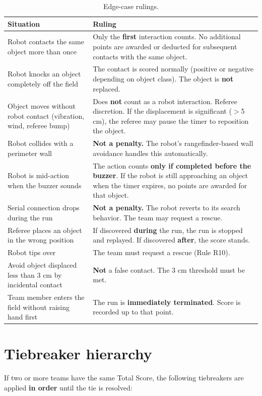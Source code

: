 \documentclass[a4]{article}
\begin{document}
\begin{table}[H]
\centering
\begin{tabular}{p{5cm}p{8cm}}
\toprule
\textbf{Situation} & \textbf{Ruling} \\
\midrule
Robot contacts the same object more than once & Only the \textbf{first} interaction counts. No additional points are awarded or deducted for subsequent contacts with the same object. \\
\addlinespace
Robot knocks an object completely off the field & The contact is scored normally (positive or negative depending on object class). The object is \textbf{not} replaced. \\
\addlinespace
Object moves without robot contact (vibration, wind, referee bump) & Does \textbf{not} count as a robot interaction. Referee discretion. If the displacement is significant ($>$5 cm), the referee may pause the timer to reposition the object. \\
\addlinespace
Robot collides with a perimeter wall & \textbf{Not a penalty.} The robot's rangefinder-based wall avoidance handles this automatically. \\
\addlinespace
Robot is mid-action when the buzzer sounds & The action counts \textbf{only if completed before the buzzer}. If the robot is still approaching an object when the timer expires, no points are awarded for that object. \\
\addlinespace
Serial connection drops during the run & \textbf{Not a penalty.} The robot reverts to its search behavior. The team may request a rescue. \\
\addlinespace
Referee places an object in the wrong position & If discovered \textbf{during} the run, the run is stopped and replayed. If discovered \textbf{after}, the score stands. \\
\addlinespace
Robot tips over & The team must request a rescue (Rule R10). \\
\addlinespace
Avoid object displaced less than 3 cm by incidental contact & \textbf{Not} a false contact. The 3 cm threshold must be met. \\
\addlinespace
Team member enters the field without raising hand first & The run is \textbf{immediately terminated}. Score is recorded up to that point. \\
\bottomrule
\end{tabular}
\caption{Edge-case rulings.}
\end{table}

\section*{Tiebreaker hierarchy}
If two or more teams have the same Total Score, the following tiebreakers are applied \textbf{in order} until the tie is resolved:
\end{document}
